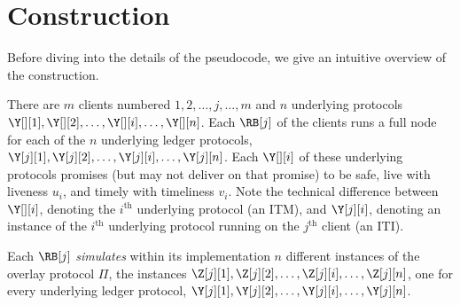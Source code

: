 \section{Construction}\label{sec:construction}

Before diving into the details of the pseudocode, we give an intuitive overview
of the \rollerblade construction.


There are $m$ \rollerblade clients numbered $1, 2,\allowbreak \ldots,\allowbreak j,\allowbreak \ldots,\allowbreak m$
and $n$ underlying protocols $\Y[][1], \Y[][2],\allowbreak \ldots,\allowbreak \Y[][i],\allowbreak \ldots,\allowbreak \Y[][n]$.
Each $\RB[j]$ of the clients runs a full node for each of the $n$ underlying
ledger protocols,
$\Y[j][1], \Y[j][2],\allowbreak\ldots,\allowbreak \Y[j][i],\allowbreak \ldots,\allowbreak \Y[j][n]$.
Each $\Y[][i]$ of these underlying protocols promises (but may not deliver on that promise)
to be safe, live with liveness $u_i$, and timely with timeliness $v_i$.
Note the technical difference between $\Y[][i]$, denoting the $i^\text{th}$ underlying protocol (an ITM),
and $\Y[j][i]$, denoting an instance of the $i^\text{th}$ underlying protocol running on the
$j^\text{th}$ client (an ITI).

Each $\RB[j]$ \emph{simulates} within its implementation $n$ different instances
of the overlay protocol $\Pi$, the instances
$\Z[j][1], \Z[j][2],\allowbreak \ldots,\allowbreak \Z[j][i],\allowbreak \ldots,\allowbreak \Z[j][n]$,
one for every underlying ledger protocol,
$\Y[j][1], \Y[j][2],\allowbreak \ldots,\allowbreak \Y[j][i],\allowbreak \ldots,\allowbreak \Y[j][n]$.

